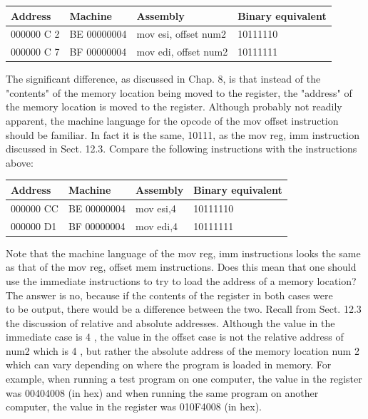 \documentclass[10pt]{book}
\begin{document}
\begin{center}
\begin{center}
\begin{center}
\begin{center}
\begin{center}
\begin{center}
\begin{tabular}{|l|l|l|l|}
\hline
Address & Machine & Assembly & Binary equivalent \\
\hline
000000 C 2 & BE 00000004 & mov esi, offset num2 & 10111110 \\
\hline
000000 C 7 & BF 00000004 & mov edi, offset num2 & 10111111 \\
\hline
\end{tabular}
\end{center}

The significant difference, as discussed in Chap. 8, is that instead of the "contents" of the memory location being moved to the register, the "address" of the memory location is moved to the register. Although probably not readily apparent, the machine language for the opcode of the mov offset instruction should be familiar. In fact it is the same, 10111, as the mov reg, imm instruction discussed in Sect. 12.3. Compare the following instructions with the instructions above:

\begin{center}
\begin{tabular}{|l|l|l|l|}
\hline
Address & Machine & Assembly & Binary equivalent \\
\hline
000000 CC & BE 00000004 & mov esi,4 & 10111110 \\
\hline
000000 D1 & BF 00000004 & mov edi,4 & 10111111 \\
\hline
\end{tabular}
\end{center}

Note that the machine language of the mov reg, imm instructions looks the same as that of the mov reg, offset mem instructions. Does this mean that one should use the immediate instructions to try to load the address of a memory location? The answer is no, because if the contents of the register in both cases were\\
to be output, there would be a difference between the two. Recall from Sect. 12.3 the discussion of relative and absolute addresses. Although the value in the immediate case is 4 , the value in the offset case is not the relative address of num2 which is 4 , but rather the absolute address of the memory location num 2 which can vary depending on where the program is loaded in memory. For example, when running a test program on one computer, the value in the register was 00404008 (in hex) and when running the same program on another computer, the value in the register was 010F4008 (in hex).



\end{center}
\end{center}
\end{center}
\end{center}
\end{center}
\end{document}
